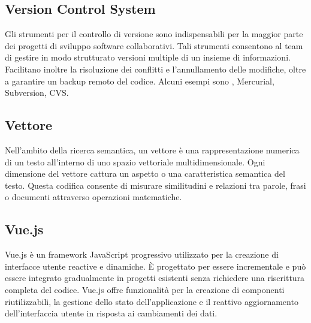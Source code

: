 \vspace{2em}
\subsection*{Version Control System}
Gli strumenti per il controllo di versione sono indispensabili per la maggior parte dei progetti di sviluppo software collaborativi. Tali strumenti consentono al team di gestire in modo strutturato versioni multiple di un insieme di informazioni. Facilitano inoltre la risoluzione dei conflitti e l'annullamento delle modifiche, oltre a garantire un backup remoto del codice.
Alcuni esempi sono , Mercurial, Subversion, CVS.

\vspace{2em}
\subsection*{Vettore}
Nell’ambito della ricerca semantica, un vettore è una rappresentazione numerica di un testo all’interno di uno spazio vettoriale multidimensionale. Ogni dimensione del vettore cattura un aspetto o una caratteristica semantica del testo. Questa codifica consente di misurare similitudini e relazioni tra parole, frasi o documenti attraverso operazioni matematiche.

\vspace{2em}
\subsection*{Vue.js}
Vue.js è un framework JavaScript progressivo utilizzato per la creazione di interfacce utente reactive e dinamiche. È progettato per essere incrementale e può essere integrato gradualmente in progetti esistenti senza richiedere una riscrittura completa del codice. Vue.js offre funzionalità per la creazione di componenti riutilizzabili, la gestione dello stato dell'applicazione e il reattivo aggiornamento dell'interfaccia utente in risposta ai cambiamenti dei dati.
